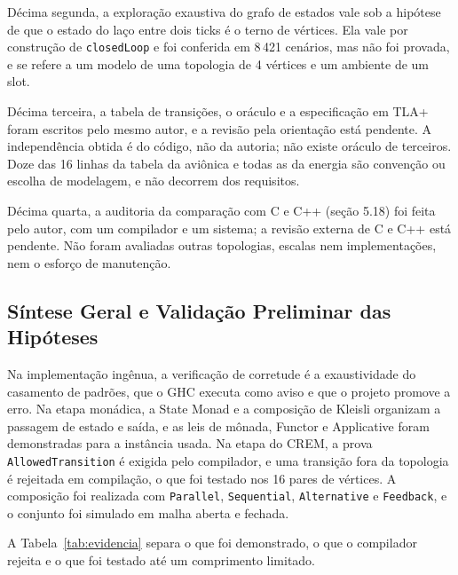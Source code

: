 \documentclass[12pt,a4paper]{article}
\begin{document}
Décima segunda, a exploração exaustiva do grafo de estados vale sob a hipótese de que o estado do laço entre dois ticks é o terno de vértices. Ela vale por construção de \texttt{closedLoop} e foi conferida em 8\,421 cenários, mas não foi provada, e se refere a um modelo de uma topologia de 4 vértices e um ambiente de um slot.

Décima terceira, a tabela de transições, o oráculo e a especificação em TLA+ foram escritos pelo mesmo autor, e a revisão pela orientação está pendente. A independência obtida é do código, não da autoria; não existe oráculo de terceiros. Doze das 16 linhas da tabela da aviônica e todas as da energia são convenção ou escolha de modelagem, e não decorrem dos requisitos.

Décima quarta, a auditoria da comparação com C e C++ (seção 5.18) foi feita pelo autor, com um compilador e um sistema; a revisão externa de C e C++ está pendente. Não foram avaliadas outras topologias, escalas nem implementações, nem o esforço de manutenção.

\subsection{Síntese Geral e Validação Preliminar das Hipóteses}

Na implementação ingênua, a verificação de corretude é a exaustividade do casamento de padrões, que o GHC executa como aviso e que o projeto promove a erro. Na etapa monádica, a State Monad e a composição de Kleisli organizam a passagem de estado e saída, e as leis de mônada, Functor e Applicative foram demonstradas para a instância usada. Na etapa do CREM, a prova \texttt{AllowedTransition} é exigida pelo compilador, e uma transição fora da topologia é rejeitada em compilação, o que foi testado nos 16 pares de vértices. A composição foi realizada com \texttt{Parallel}, \texttt{Sequential}, \texttt{Alternative} e \texttt{Feedback}, e o conjunto foi simulado em malha aberta e fechada.

A Tabela~\ref{tab:evidencia} separa o que foi demonstrado, o que o compilador rejeita e o que foi testado até um comprimento limitado.
\end{document}
